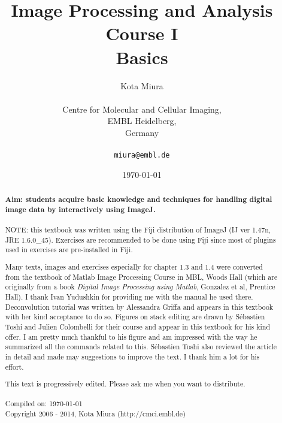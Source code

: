 \title{Image Processing and Analysis Course I\\
Basics}
\author{Kota Miura\\
\\
  Centre for Molecular and Cellular Imaging,\\
  EMBL Heidelberg,\\
  Germany\\
\\
\texttt{miura@embl.de}
}

\date{\today}

\pagestyle{empty}
\titleTH
\clearpage
\pagestyle{fancyplain}
\begin{abstract}
\HRule

\textbf{Aim: students acquire basic knowledge and techniques for handling
digital image data by interactively using ImageJ.} \\
\\

NOTE: this textbook was written using the Fiji distribution of ImageJ (IJ ver 1.47n, JRE 1.6.0\_45).
Exercises are recommended to be done using Fiji since most of plugins used in
exercises are pre-installed in Fiji.

Many texts, images and exercises especially for chapter 1.3 and 1.4 were
converted from the textbook of Matlab Image Processing Course in MBL, Woods Hall
(which are originally from a book \textit{Digital Image Processing
using Matlab}, Gonzalez et al, Prentice Hall). I thank Ivan Yudushkin for
providing me with the manual he used there.
Deconvolution tutorial was written by Alessandra Griffa and appears in this
textbook with her kind acceptance to do so.
Figures on stack editing are drawn by S\'{e}bastien Toshi and Julien Colombelli for their course and appear in this textbook for his kind offer. I am pretty much thankful to his figure and am impressed with the way he summarized all the commands related to this.
S\'{e}bastien Toshi also reviewed the article in detail and made may suggestions to improve the text. I thank him a lot for his effort. 


This text is progressively edited. Please ask me when you want to distribute. \\
\\
Compiled on: \today \\
Copyright 2006 - 2014, Kota Miura (http://cmci.embl.de)

\HRule
\end{abstract}